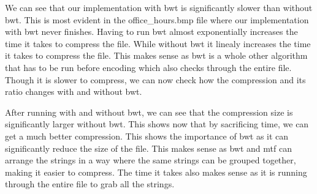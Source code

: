 \documentclass[12pt,letterpaper]{article}
\begin{document}
We can see that our implementation with bwt is significantly slower than without bwt.
This is most evident in the office\_hours.bmp file where our implementation with bwt never finishes.
Having to run bwt almost exponentially increases the time it takes to compress the file.
While without bwt it linealy increases the time it takes to compress the file.
This makes sense as bwt is a whole other algorithm that has to be run before encoding which also checks through the entire file.
Though it is slower to compress, we can now check how the compression and its ratio changes with and without bwt.

\begin{table}[h]
    \caption{Compression Size With and Without BWT}
\end{table}

After running with and without bwt, we can see that the compression size is significantly larger without bwt.
This shows now that by sacrificing time, we can get a much better compression.
This shows the importance of bwt as it can significantly reduce the size of the file.
This makes sense as bwt and mtf can arrange the strings in a way where the same strings can be grouped together, making it easier to compress.
The time it takes also makes sense as it is running through the entire file to grab all the strings.
\end{document}
